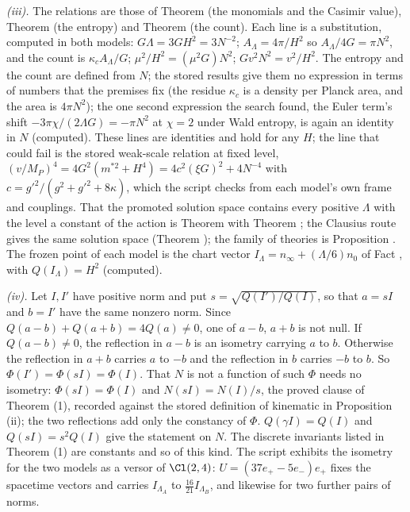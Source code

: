 \emph{(iii).} The relations are those of Theorem  (the monomials and the Casimir value), Theorem  (the entropy) and Theorem  (the count). Each line is a substitution, computed in both models: $G\Lambda = 3GH^{2} = 3N^{-2}$; $A_{\Lambda} = 4\pi/H^{2}$ so $A_{\Lambda}/4G = \pi N^{2}$, and the count is $\kappa_{c}A_{\Lambda}/G$; $\mu^{2}/H^{2} = (\mu^{2}G)N^{2}$; $Gv^{2}N^{2} = v^{2}/H^{2}$. The entropy and the count are defined from $N$; the stored results give them no expression in terms of numbers that the premises fix (the residue $\kappa_{c}$ is a density per Planck area, and the area is $4\pi N^{2}$); the one second expression the search found, the Euler term's shift $-3\pi\chi/(2\Lambda G) = -\pi N^{2}$ at $\chi = 2$ under Wald entropy, is again an identity in $N$ (computed). These lines are identities and hold for any $H$; the line that could fail is the stored weak-scale relation at fixed level, $(v/M_{P})^{4} = 4G^{2}(m^{*2} + H^{4}) = 4c^{2}(\xi G)^{2} + 4N^{-4}$ with $c = g'^{2}/(g^{2} + g'^{2} + 8\kappa)$, which the script checks from each model's own frame and couplings. That the promoted solution space contains every positive $\Lambda$ with the level a constant of the action is Theorem  with Theorem ; the Clausius route gives the same solution space (Theorem ); the family of theories is Proposition . The frozen point of each model is the chart vector $I_{\Lambda} = n_{\infty} + (\Lambda/6)n_{0}$ of Fact , with $Q(I_{\Lambda}) = H^{2}$ (computed).

\emph{(iv).} Let $I, I'$ have positive norm and put $s = \sqrt{Q(I')/Q(I)}$, so that $a = sI$ and $b = I'$ have the same nonzero norm. Since $Q(a - b) + Q(a + b) = 4Q(a) \neq 0$, one of $a - b$, $a + b$ is not null. If $Q(a - b) \neq 0$, the reflection in $a - b$ is an isometry carrying $a$ to $b$. Otherwise the reflection in $a + b$ carries $a$ to $-b$ and the reflection in $b$ carries $-b$ to $b$. So $\Phi(I') = \Phi(sI) = \Phi(I)$. That $N$ is not a function of such $\Phi$ needs no isometry: $\Phi(sI) = \Phi(I)$ and $N(sI) = N(I)/s$, the proved clause of Theorem (1), recorded against the stored definition of kinematic in Proposition (ii); the two reflections add only the constancy of $\Phi$. $Q(\gamma I) = Q(I)$ and $Q(sI) = s^{2}Q(I)$ give the statement on $N$. The discrete invariants listed in Theorem (1) are constants and so of this kind. The script exhibits the isometry for the two models as a versor of $\Cl(2,4)$: $U = (37e_{+} - 5e_{-})e_{+}$ fixes the spacetime vectors and carries $I_{\Lambda_{A}}$ to $\tfrac{16}{21}I_{\Lambda_{B}}$, and likewise for two further pairs of norms.

